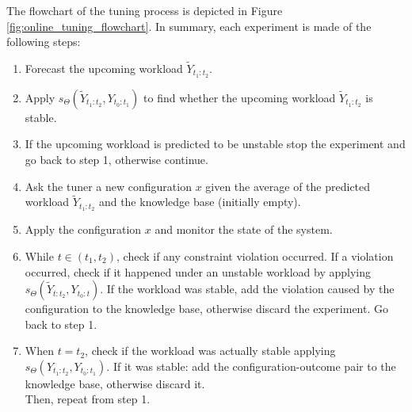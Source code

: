 \documentclass[a4paper, 12pt]{article} %
\begin{document}
	The flowchart of the tuning process is depicted in Figure \ref{fig:online_tuning_flowchart}. In summary, each experiment is made of the following steps: 
	\begin{enumerate}
		\item Forecast the upcoming workload $\tilde{Y}_{t_1:t_2}$.
		\item Apply $s_\Theta(\tilde{Y}_{t_1:t_2}, Y_{t_0:t_1})$ to find whether the upcoming workload $\tilde{Y}_{t_1:t_2}$ is stable.
		\item If the upcoming workload is predicted to be unstable stop the experiment and go back to step 1, otherwise continue.
		\item Ask the tuner a new configuration $x$ given the average of the predicted workload $\tilde{Y}_{t_1:t_2}$ and the knowledge base (initially empty).
		\item Apply the configuration $x$ and monitor the state of the system.
		\item While $t \in (t_1, t_2)$, check if any constraint violation occurred. If a violation occurred, check if it happened under an unstable workload by applying $s_\Theta(\tilde{Y}_{t:t_2}, Y_{t_0:t})$. If the workload was stable, add the violation caused by the configuration to the knowledge base, otherwise discard the experiment. Go back to step 1.
		\item When $t=t_2$, check if the workload was actually stable applying\\ $s_\Theta(Y_{t_1:t_2}, Y_{t_0:t_1})$.  If it was stable: add the configuration-outcome pair to the knowledge base, otherwise discard it.\\
		Then, repeat from step 1.
	\end{enumerate}
	
\end{document}
